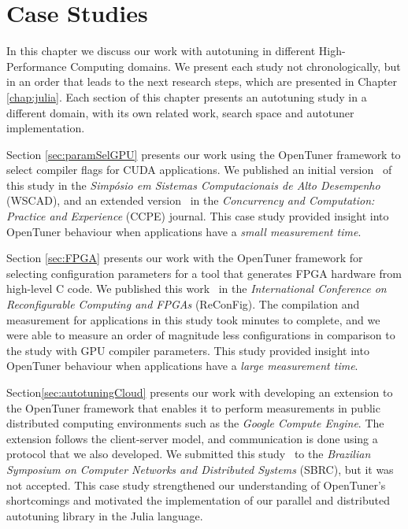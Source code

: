 \chapter{Case Studies}
\label{chap:usecases}

In this chapter we discuss our work with autotuning in different
High-Performance Computing domains. We present each study not chronologically,
but in an order that leads to the next research steps, which are presented in
Chapter \ref{chap:julia}. Each section of this chapter presents an autotuning
study in a different domain, with its own related work, search space and
autotuner implementation.

Section \ref{sec:paramSelGPU} presents our work using the OpenTuner framework
to select compiler flags for CUDA applications.  We published an initial
version~\cite{bruel2015autotuningGPU} of this study in the \textit{Simpósio em
Sistemas Computacionais de Alto Desempenho} (WSCAD), and an extended
version~\cite{bruel2017autotuning} in the \textit{Concurrency and Computation:
Practice and Experience} (CCPE) journal.  This case study provided insight into
OpenTuner behaviour when applications have a \textit{small measurement time}.

Section \ref{sec:FPGA} presents our work with the OpenTuner framework for
selecting configuration parameters for a tool that generates FPGA hardware from
high-level C code.  We published this work~\cite{} in the \textit{International
Conference on Reconfigurable Computing and FPGAs} (ReConFig).  The compilation
and measurement for applications in this study took minutes to complete, and we
were able to measure an order of magnitude less configurations in comparison to
the study with GPU compiler parameters. This study provided insight into
OpenTuner behaviour when applications have a \textit{large measurement time}.


Section\ref{sec:autotuningCloud} presents our work with developing an extension
to the OpenTuner framework that enables it to perform measurements in public
distributed computing environments such as the \textit{Google Compute Engine}.
The extension follows the client-server model, and communication is done using
a protocol that we also developed. We submitted this study~\cite{bruel2016new}
to the \textit{Brazilian Symposium on Computer Networks and Distributed
Systems} (SBRC), but it was not accepted. This case study strengthened our
understanding of OpenTuner's shortcomings and motivated the implementation
of our parallel and distributed autotuning library in the Julia language.

